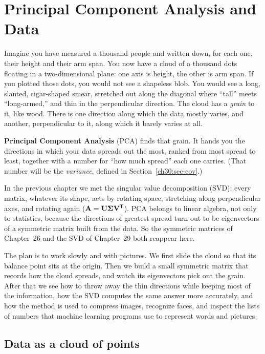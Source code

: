 \chapter{Principal Component Analysis and Data}

Imagine you have measured a thousand people and written down, for each one, their
height and their arm span. You now have a cloud of a thousand dots floating in a
two-dimensional plane: one axis is height, the other is arm span. If you
plotted those dots, you would not see a shapeless blob. You would see a long,
slanted, cigar-shaped smear, stretched out along the diagonal where ``tall'' meets
``long-armed,'' and thin in the perpendicular direction. The cloud has a
\emph{grain} to it, like wood. There is one direction along which the data mostly
varies, and another, perpendicular to it, along which it barely varies at all.

\textbf{Principal Component Analysis} (PCA) finds that grain. It hands you the
directions in which your data spreads out the most, ranked from most spread to
least, together with a number for ``how much spread'' each one carries. (That
number will be the \emph{variance}, defined in Section~\ref{ch30:sec-cov}.)

In the previous chapter we met the singular value decomposition (SVD): every
matrix, whatever its shape, acts by rotating space, stretching along perpendicular
axes, and rotating again ($\mathbf{A} = \mathbf{U}\mathbf{\Sigma}\mathbf{V}^{\mathsf{T}}$). PCA belongs to
linear algebra, not only to statistics, because the directions of greatest spread
turn out to be eigenvectors of a symmetric matrix built from the data. So the
symmetric matrices of Chapter~26 and the SVD of Chapter~29 both reappear here.

The plan is to work slowly and with pictures. We first slide the cloud so that its
balance point sits at the origin. Then we build a small symmetric matrix that records
how the cloud spreads, and watch its eigenvectors pick out the grain. After that we
see how to throw away the thin directions while keeping most of the information, how
the SVD computes the same answer more accurately, and how the method is used to
compress images, recognize faces, and inspect the lists of numbers that machine
learning programs use to represent words and pictures.

\chapterline

\section{Data as a cloud of points}


